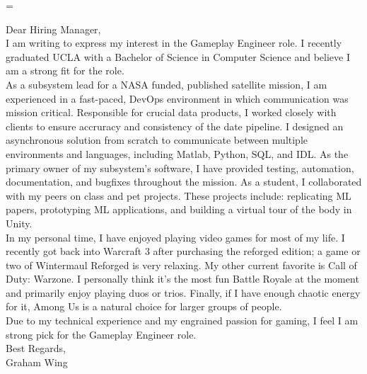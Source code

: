 \emergencystretch=\maxdimen
{}


\begin{minipage}[t]{.95\textwidth} %
\large
Dear Hiring Manager,
\vspace{10pt}\\
I am writing to express my interest in the Gameplay Engineer role. I recently graduated UCLA with a Bachelor of Science in Computer Science and believe I am a strong fit for the role. 
\vspace{6pt}\\
As a subsystem lead for a NASA funded, published satellite mission, I am experienced in a fast-paced, DevOps environment in which communication was mission critical. Responsible for crucial data products, I worked closely with clients to ensure accruracy and consistency of the date pipeline. I designed an asynchronous solution from scratch to communicate between multiple environments and languages, including Matlab, Python, SQL, and IDL. As the primary owner of my subsystem's software, I have provided testing, automation, documentation, and bugfixes throughout the mission. As a student, I collaborated with my peers on class and pet projects. These projects include: replicating ML papers, prototyping ML applications, and building a virtual tour of the body in Unity. 
\vspace{6pt}\\
In my personal time, I have enjoyed playing video games for most of my life. I recently got back into Warcraft 3 after purchasing the reforged edition; a game or two of Wintermaul Reforged is very relaxing. My other current favorite is Call of Duty: Warzone. I personally think it's the most fun Battle Royale at the moment and primarily enjoy playing duos or trios. Finally, if I have enough chaotic energy for it, Among Us is a natural choice for larger groups of people. 
\vspace{6pt}\\
Due to my technical experience and my engrained passion for gaming, I feel I am strong pick for the Gameplay Engineer role.
\vspace{22pt}\\
Best Regards,
\vspace{15pt}\\
Graham Wing


\end{minipage} %
